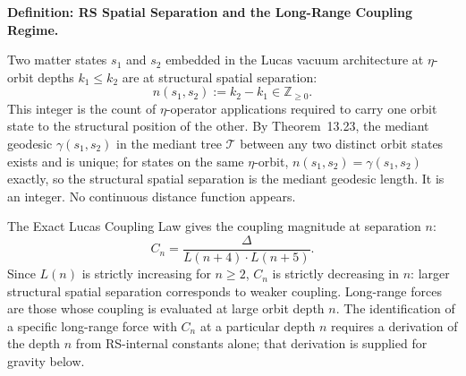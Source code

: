 \documentclass[11pt, letterpaper]{article}
\theoremstyle{definition}
\theoremstyle{plain}
\begin{document}
\begin{rsbox}
\textbf{Definition: RS Spatial Separation and the Long-Range Coupling Regime.}

Two matter states $s_1$ and $s_2$ embedded in the Lucas vacuum architecture at
$\eta$-orbit depths $k_1 \leq k_2$ are at structural spatial separation:
\begin{equation}
    n(s_1, s_2) := k_2 - k_1 \in \mathbb{Z}_{\geq 0}.
\end{equation}
This integer is the count of $\eta$-operator applications required to carry one orbit
state to the structural position of the other. By Theorem~13.23, the mediant geodesic
$\gamma(s_1, s_2)$ in the mediant tree $\mathcal{T}$ between any two distinct orbit states
exists and is unique; for states on the same $\eta$-orbit, $n(s_1, s_2) = \gamma(s_1, s_2)$
exactly, so the structural spatial separation is the mediant geodesic length. It is an
integer. No continuous distance function appears.

The Exact Lucas Coupling Law gives the coupling magnitude at separation $n$:
\[
    C_n = \frac{\Delta}{L(n+4) \cdot L(n+5)}.
\]
Since $L(n)$ is strictly increasing for $n \geq 2$, $C_n$ is strictly decreasing in $n$:
larger structural spatial separation corresponds to weaker coupling. Long-range forces
are those whose coupling is evaluated at large orbit depth $n$. The identification of a
specific long-range force with $C_n$ at a particular depth $n$ requires a derivation
of the depth $n$ from RS-internal constants alone; that derivation is supplied for
gravity below.
\end{rsbox}
\end{document}
